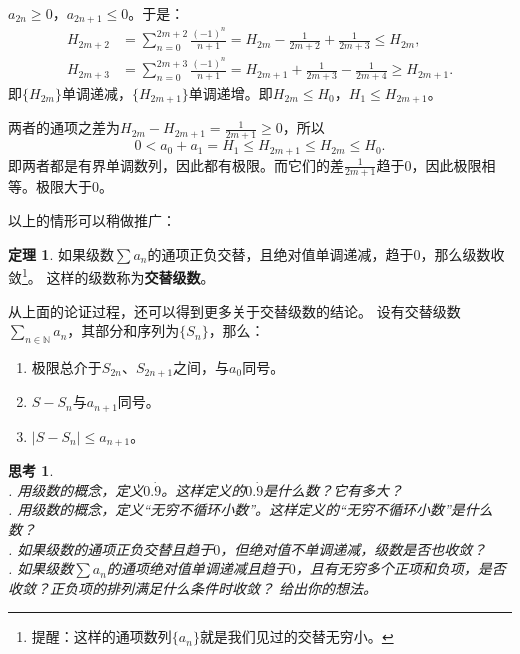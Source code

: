 \documentclass[12pt,UTF8]{ctexbook}
\theoremstyle{definition}
\newtheorem{tm}{定理}[section]
\theoremstyle{plain}
\newtheorem{sk}{思考}[section]
\begin{document}
$a_{2n} \geqslant 0$，$a_{2n+1} \leqslant 0$。于是：
\begin{align*}
    H_{2m+2} &= \sum_{n=0}^{2m+2} \frac{(-1)^{n}}{n+1} = H_{2m} - \frac{1}{2m+2} + \frac{1}{2m+3} \leqslant H_{2m},  \\
    H_{2m+3} &= \sum_{n=0}^{2m+3} \frac{(-1)^{n}}{n+1} = H_{2m+1} + \frac{1}{2m+3} - \frac{1}{2m+4} \geqslant H_{2m+1}. 
\end{align*}
即$\{H_{2m}\}$单调递减，$\{H_{2m+1}\}$单调递增。即$H_{2m} \leqslant H_0 $，$H_1\leqslant H_{2m+1}$。

两者的通项之差为$ H_{2m} - H_{2m+1} = \frac{1}{2m+1} \geqslant 0$，所以
$$ 0 < a_0 + a_1 = H_1 \leqslant H_{2m+1} \leqslant H_{2m} \leqslant H_0. $$
即两者都是有界单调数列，因此都有极限。而它们的差$\frac{1}{2m+1}$趋于$0$，因此极限相等。极限大于$0$。

以上的情形可以稍做推广：
\begin{tm}
    如果级数$\sum a_n$的通项正负交替，且绝对值单调递减，趋于$0$，那么级数收敛\footnote{提醒：这样的通项数列$\{a_n\}$就是我们见过的交替无穷小。}。
    这样的级数称为\textbf{交替级数}。
\end{tm}

从上面的论证过程，还可以得到更多关于交替级数的结论。
设有交替级数$\sum_{n\in\mathbb{N}} a_n$，其部分和序列为$\{S_{n}\}$，那么：
\begin{enumerate}
    \item 极限总介于$S_{2n}$、$S_{2n+1}$之间，与$a_0$同号。
    \item $S - S_n$与$a_{n+1}$同号。
    \item $|S - S_n|\leqslant a_{n+1}$。
\end{enumerate}

\begin{sk}
    \mbox{} \\
    . 用级数的概念，定义$0.\dot{9}$。这样定义的$0.\dot{9}$是什么数？它有多大？\\
    . 用级数的概念，定义“无穷不循环小数”。这样定义的“无穷不循环小数”是什么数？\\
    . 如果级数的通项正负交替且趋于$0$，但绝对值不单调递减，级数是否也收敛？\\
    . 如果级数$\sum a_n$的通项绝对值单调递减且趋于$0$，且有无穷多个正项和负项，是否收敛？正负项的排列满足什么条件时收敛？
    给出你的想法。
    
\end{sk}
\end{document}
